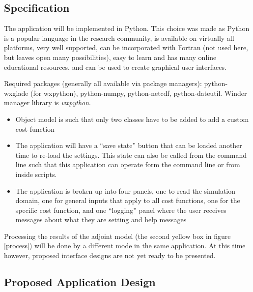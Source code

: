 \documentclass{article}
\begin{document}
\subsection{Specification}

The application will be implemented in Python.  This choice was made as Python is a popular language in the research community, is available on virtually all platforms, very well supported, can be incorporated with Fortran (not used here, but leaves open many possibilities), easy to learn and has many online educational resources, and can be used to create graphical user interfaces.

Required packages (generally all available via package managers): python-wxglade (for wxpython), python-numpy, python-netcdf, python-dateutil.  Winder manager library is \emph{wxpython}.

\begin{itemize}
	\item Object model is such that only two classes have to be added to add a custom cost-function
	\item The application will have a ``save state'' button that can be loaded another time to re-load the settings.  This state can also be called from the command line such that this application can operate form the command line or from inside scripts.
	\item The application is broken up into four panels, one to read the simulation domain, one for general inputs that apply to all cost functions, one for the specific cost function, and one ``logging'' panel where the user receives messages about what they are setting and help messages
\end{itemize}

Processing the results of the adjoint model (the second yellow box in figure \ref{process}) will be done by a different mode in the same application.  At this time however, proposed interface designs are not yet ready to be presented.

\subsection{Proposed Application Design}
\end{document}
